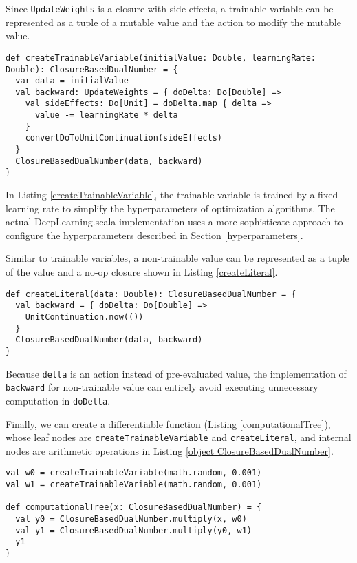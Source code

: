 Since \lstinline{UpdateWeights} is a closure with side effects, a \gls{trainable variable} can be represented as a tuple of a mutable value and the action to modify the mutable value.

\begin{lstlisting}[float={htbp},caption={Create a dual number for a \gls{trainable variable}}, label={createTrainableVariable}]
def createTrainableVariable(initialValue: Double, learningRate: Double): ClosureBasedDualNumber = {
  var data = initialValue
  val backward: UpdateWeights = { doDelta: Do[Double] =>
    val sideEffects: Do[Unit] = doDelta.map { delta =>
      value -= learningRate * delta
    }
    convertDoToUnitContinuation(sideEffects)
  }
  ClosureBasedDualNumber(data, backward)
}
\end{lstlisting}

In Listing \ref{createTrainableVariable}, the \gls{trainable variable} is trained by a fixed learning rate to simplify the hyperparameters of optimization algorithms. The actual DeepLearning.scala implementation uses a more sophisticate approach to configure the hyperparameters described in Section \ref{hyperparameters}.

Similar to \glspl{trainable variable}, a non-trainable value can be represented as a tuple of the value and a no-op closure shown in Listing \ref{createLiteral}.

\begin{lstlisting}[float={htbp},caption={Create a dual number for a  non-trainable value}, label={createLiteral}]
def createLiteral(data: Double): ClosureBasedDualNumber = {
  val backward = { doDelta: Do[Double] =>
    UnitContinuation.now(())
  }
  ClosureBasedDualNumber(data, backward)
}
\end{lstlisting}

Because \lstinline{delta} is an action instead of pre-evaluated value, the implementation of \lstinline{backward} for non-trainable value can entirely avoid executing unnecessary computation in \lstinline{doDelta}.

Finally, we can create a differentiable function (Listing \ref{computationalTree}), whose leaf nodes are \lstinline{createTrainableVariable} and \lstinline{createLiteral}, and internal nodes are arithmetic operations in Listing \ref{object ClosureBasedDualNumber}.

\begin{lstlisting}[float={htbp},caption={A tree-structured \gls{differentiable function}},label={computationalTree}]
val w0 = createTrainableVariable(math.random, 0.001)
val w1 = createTrainableVariable(math.random, 0.001)

def computationalTree(x: ClosureBasedDualNumber) = {
  val y0 = ClosureBasedDualNumber.multiply(x, w0)
  val y1 = ClosureBasedDualNumber.multiply(y0, w1)
  y1
}
\end{lstlisting}

